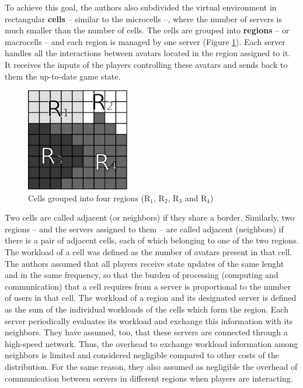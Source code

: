 To achieve this goal, the authors also subdivided the virtual environment in rectangular \textbf{cells} -- similar to the microcells --, where the number of servers is much smaller than the number of cells. The cells are grouped into \textbf{regions} -- or macrocells -- and each region is managed by one server (Figure \ref{fig:macromicro}). Each server handles all the interactions between avatars located in the region assigned to it. It receives the inputs of the players controlling these avatars and sends back to them the up-to-date game state. 

\begin{figure}
 \centering
 \includegraphics[width=0.4\textwidth]{images/macromicro}
 \caption{Cells grouped into four regions (R$_1$, R$_2$, R$_3$ and R$_4$)}
 \label{fig:macromicro}
\end{figure}

Two cells are called adjacent (or neighbors) if they share a border. Similarly, two regions -- and the servers assigned to them -- are called adjacent (neighbors) if there is a pair of adjacent cells, each of which belonging to one of the two regions. The workload of a cell was defined as the number of avatars present in that cell. The authors assumed that all players receive state updates of the same lenght and in the same frequency, so that the burden of processing (computing and communication) that a cell requires from a server is proportional to the number of users in that cell. The workload of a region and its designated server is defined as the sum of the individual workloads of the cells which form the region. Each server periodically evaluates its workload and exchange this information with its neighbors. They have assumed, too, that these servers are connected through a high-speed network. Thus, the overhead to exchange workload information among neighbors is limited and considered negligible compared to other costs of the distribution. For the same reason, they also assumed as negligible the overhead of communication between servers in different regions when players are interacting.

